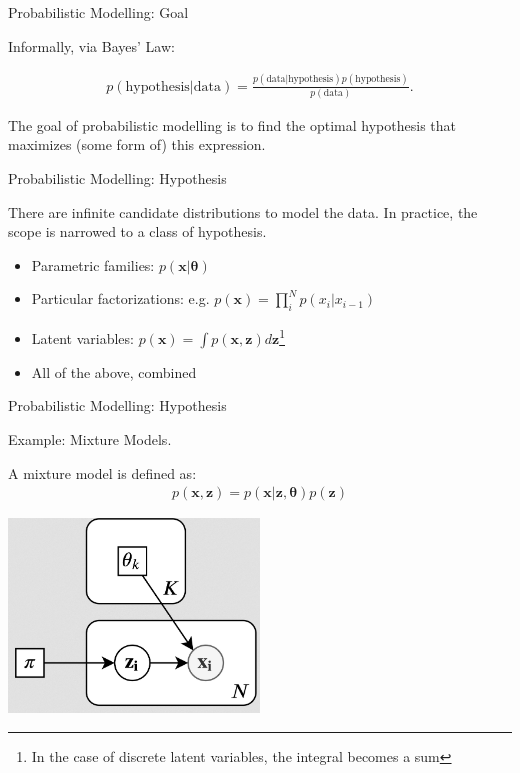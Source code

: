 \documentclass[12pt,ignorenonframetext,]{beamer}
\begin{document}
\begin{frame}{Probabilistic Modelling: Goal}
\protect\hypertarget{probabilistic-modelling-goal-1}{}

Informally, via Bayes' Law:

\begin{align*}
    p(\mbox{hypothesis}|\mbox{data}) = \frac{p(\mbox{data}|\mbox{hypothesis})p(\mbox{hypothesis})}{p(\mbox{data})} \label{eq:bayes}.
\end{align*}

\pause

The goal of probabilistic modelling is to find the optimal hypothesis
that maximizes (some form of) this expression.

\end{frame}

\begin{frame}{Probabilistic Modelling: Hypothesis}
\protect\hypertarget{probabilistic-modelling-hypothesis}{}

There are infinite candidate distributions to model the data. In
practice, the scope is narrowed to a class of hypothesis.

\pause

\begin{itemize}[<+->]
    \item Parametric families: $p(\bm{x}|\bm\theta)$
    \item Particular factorizations: e.g. $p(\bm{x}) = \prod_i^N p(x_i|x_{i-1})$
    \item Latent variables: $p(\bm{x}) = \int p(\bm{x}, \bm{z}) d\bm{z}$\footnote<4->{In
    the case of discrete latent variables, the integral becomes a sum}
    \item All of the above, combined
\end{itemize}

\end{frame}

\begin{frame}{Probabilistic Modelling: Hypothesis}
\protect\hypertarget{probabilistic-modelling-hypothesis-1}{}

Example: Mixture Models.

\pause

A mixture model is defined as: \begin{align*}
    p(\bm{x}, \bm{z}) = p(\bm{x}|\bm{z}, \bm\theta) p(\bm{z})
\end{align*}

\pause

\centering

\includegraphics[width=0.5\textwidth]{figures/plate_diagram2.png}

\end{frame}
\end{document}
